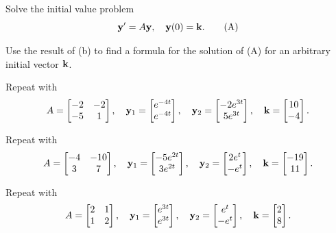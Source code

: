 \begin{exerciselist}
\begin{alist}
\item %
Solve  the initial value problem
\[
\mathbf{y}'=A\mathbf{y},\quad   \mathbf{y}(0)=\mathbf{k}.\tag{A}
\]

\item %
Use the result of (b) to find a formula for
the solution of (A) for an arbitrary initial vector $\mathbf{k}$.
\end{alist}


\item\label{exer:10.3.8}Repeat   with
\[
A=\begin{bmatrix}-2&-2\\-5&1\end{bmatrix}, \quad
\mathbf{y}_1=\begin{bmatrix}e^{-4t} \\ e^{-4t}\end{bmatrix}, \quad
\mathbf{y}_2=\begin{bmatrix}-2e^{3t}\\ 5e^{3t}\end{bmatrix}, \quad
\mathbf{k}=\begin{bmatrix}10 \\-4\end{bmatrix}.
\]

\item\label{exer:10.3.9}Repeat   with
\[
 A=\begin{bmatrix}-4&-10\\3&7\end{bmatrix}, \quad
\mathbf{y}_1=\begin{bmatrix}-5e^{2t} \\ 3e^{2t}\end{bmatrix}, \quad
\mathbf{y}_2=\begin{bmatrix} 2e^t \\-e^t\end{bmatrix}, \quad
\mathbf{k}=\begin{bmatrix}-19 \\ 11\end{bmatrix}.
\]

\item\label{exer:10.3.10}Repeat  with
\[
A=\begin{bmatrix}2&1\\1&2\end{bmatrix}, \quad
\mathbf{y}_1=\begin{bmatrix} e^{3t} \\e^{3t}\end{bmatrix}, \quad
\mathbf{y}_2=\begin{bmatrix}e^t \\-e^t\end{bmatrix}, \quad
\mathbf{k}=\begin{bmatrix} 2 \\ 8\end{bmatrix}.
\]


\end{exerciselist}
